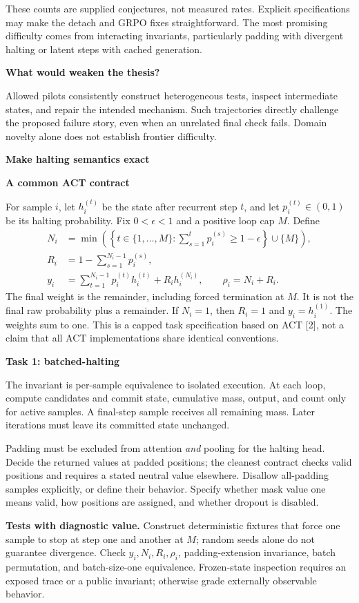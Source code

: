\documentclass[11pt,a4paper]{article}
\newcommand{\sect}[2]{\vspace{3pt}{\small\color{accent}\textbf{#1}}\par{\LARGE\bfseries #2}\par\vspace{6pt}}
\newcommand{\sub}[1]{\vspace{4pt}\textbf{#1}\par}
\begin{document}
These counts are supplied conjectures, not measured rates. Explicit specifications may make the detach and GRPO fixes straightforward. The most promising difficulty comes from interacting invariants, particularly padding with divergent halting or latent steps with cached generation.

\sub{What would weaken the thesis?}
Allowed pilots consistently construct heterogeneous tests, inspect intermediate states, and repair the intended mechanism. Such trajectories directly challenge the proposed failure story, even when an unrelated final check fails. Domain novelty alone does not establish frontier difficulty.

\newpage
\sect{02 / TASKS 1 AND 5}{Make halting semantics exact}

\sub{A common ACT contract}
For sample $i$, let $h_i^{(t)}$ be the state after recurrent step $t$, and let $p_i^{(t)}\in(0,1)$ be its halting probability. Fix $0<\epsilon<1$ and a positive loop cap $M$. Define
\begin{align*}
N_i&=\min\left(\left\{t\in\{1,\ldots,M\}:\sum_{s=1}^{t}p_i^{(s)}\geq1-\epsilon\right\}\cup\{M\}\right),\\
R_i&=1-\sum_{s=1}^{N_i-1}p_i^{(s)},\\
y_i&=\sum_{t=1}^{N_i-1}p_i^{(t)}h_i^{(t)}+R_i h_i^{(N_i)},\qquad
\rho_i=N_i+R_i.
\end{align*}
The final weight is the remainder, including forced termination at $M$. It is not the final raw probability plus a remainder. If $N_i=1$, then $R_i=1$ and $y_i=h_i^{(1)}$. The weights sum to one. This is a capped task specification based on ACT [2], not a claim that all ACT implementations share identical conventions.

\sub{Task 1: batched-halting}
The invariant is per-sample equivalence to isolated execution. At each loop, compute candidates and commit state, cumulative mass, output, and count only for active samples. A final-step sample receives all remaining mass. Later iterations must leave its committed state unchanged.

Padding must be excluded from attention \emph{and} pooling for the halting head. Decide the returned values at padded positions; the cleanest contract checks valid positions and requires a stated neutral value elsewhere. Disallow all-padding samples explicitly, or define their behavior. Specify whether mask value one means valid, how positions are assigned, and whether dropout is disabled.

\textbf{Tests with diagnostic value.} Construct deterministic fixtures that force one sample to stop at step one and another at $M$; random seeds alone do not guarantee divergence. Check $y_i,N_i,R_i,\rho_i$, padding-extension invariance, batch permutation, and batch-size-one equivalence. Frozen-state inspection requires an exposed trace or a public invariant; otherwise grade externally observable behavior.
\end{document}
